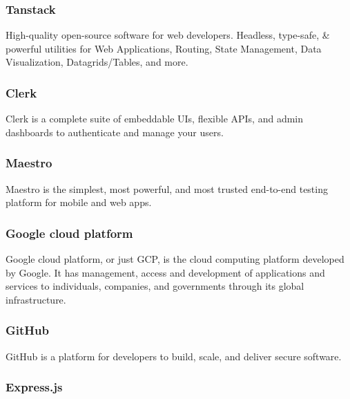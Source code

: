 \subsubsection*{\protect{} Tanstack}
                                                                      
High-quality open-source software for web developers. Headless, type-safe, \& powerful utilities for Web Applications, Routing, State Management, Data Visualization, Datagrids/Tables, and more.

\subsubsection*{\protect{} Clerk}
                                                                        
Clerk is a complete suite of embeddable UIs, flexible APIs, and admin dashboards to authenticate and manage your users.

\subsubsection*{\protect{} Maestro}
                                                                        
Maestro is the simplest, most powerful, and most trusted end-to-end testing platform for mobile and web apps.

\subsubsection*{\protect{} Google cloud platform}

Google cloud platform, or just GCP, is the cloud computing platform developed by Google. It has management, access and development of applications and services to individuals, companies, and governments through its global infrastructure.

\subsubsection*{\protect{} GitHub}

GitHub is a platform for developers to build, scale, and deliver secure software.

\subsubsection*{\protect{} Express.js}

